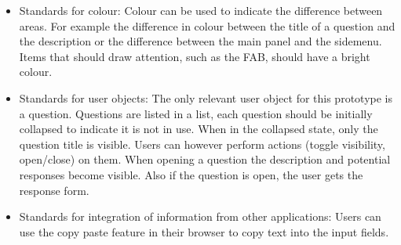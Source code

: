 \begin{itemize}
\item Standards for colour: Colour can be used to indicate the difference between areas. For example the difference in colour between the title of a question and the description or the difference between the main panel and the sidemenu. Items that should draw attention, such as the FAB, should have a bright colour.
\item Standards for user objects: The only relevant user object for this prototype is a question. Questions are listed in a list, each question should be initially collapsed to indicate it is not in use. When in the collapsed state, only the question title is visible. Users can however perform actions (toggle visibility, open/close) on them. When opening a question the description and potential responses become visible. Also if the question is open, the user gets the response form.
\item Standards for integration of information from other applications: Users can use the copy paste feature in their browser to copy text into the input fields.  
\end{itemize}

